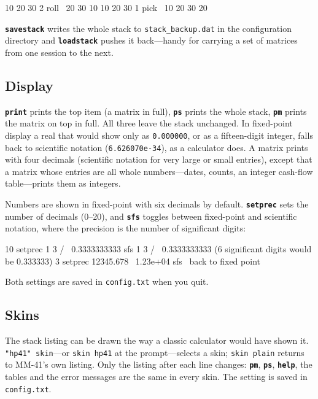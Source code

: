 \documentclass[11pt,letterpaper]{article}
\newcommand{\code}[1]{\texttt{#1}}
\newcommand{\cmd}[1]{\texttt{\textbf{#1}}}
\begin{document}
\begin{rpn}
10 20 30 2 roll     \ 20 30 10
10 20 30 1 pick     \ 10 20 30 20
\end{rpn}

\cmd{savestack} writes the whole stack to \code{stack\_backup.dat} in the configuration directory and \cmd{loadstack} pushes it back---handy for carrying a set of matrices from one session to the next.

\subsection{Display}

\cmd{print} prints the top item (a matrix in full), \cmd{ps} prints the whole stack, \cmd{pm} prints the matrix on top in full. All three leave the stack unchanged. In fixed-point display a real that would show only as \code{0.000000}, or as a fifteen-digit integer, falls back to scientific notation (\code{6.626070e-34}), as a calculator does. A matrix prints with four decimals (scientific notation for very large or small entries), except that a matrix whose entries are all whole numbers---dates, counts, an integer cash-flow table---prints them as integers.

Numbers are shown in fixed-point with six decimals by default. \cmd{setprec} sets the number of decimals (0--20), and \cmd{sfs} toggles between fixed-point and scientific notation, where the precision is the number of significant digits:
\begin{rpn}
10 setprec 1 3 /      \ 0.3333333333
sfs 1 3 /             \ 0.3333333333  (6 significant digits would be 0.333333)
3 setprec 12345.678   \ 1.23e+04
sfs                   \ back to fixed point
\end{rpn}
Both settings are saved in \code{config.txt} when you quit.

\subsection{Skins}
\label{sec:skins}

The stack listing can be drawn the way a classic calculator would have shown it. \code{"hp41" skin}---or \code{skin hp41} at the prompt---selects a skin; \code{skin plain} returns to MM-41's own listing. Only the listing after each line changes: \cmd{pm}, \cmd{ps}, \cmd{help}, the tables and the error messages are the same in every skin. The setting is saved in \code{config.txt}.
\end{document}
